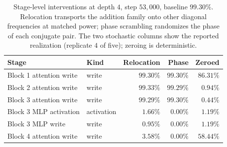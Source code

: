 \begin{table}[t]
\centering\small
\caption{Stage-level interventions at depth $4$, step $53{,}000$, baseline $99.30\%$.
Relocation transports the addition family onto other diagonal frequencies at matched power;
phase scrambling randomizes the phase of each conjugate pair. The two stochastic columns
show the reported realization (replicate $4$ of five); zeroing is deterministic.}
\label{tab:stagewise}
\begin{tabular}{llrrr}
\toprule
Stage & Kind & Relocation & Phase & Zeroed \\
\midrule
Block 1 attention write & write & $99.30\%$ & $99.30\%$ & $86.31\%$ \\
Block 2 attention write & write & $99.33\%$ & $99.29\%$ & $0.94\%$ \\
Block 3 attention write & write & $99.29\%$ & $99.30\%$ & $0.44\%$ \\
\midrule
Block 3 MLP activation & activation & $1.66\%$ & $0.00\%$ & $1.19\%$ \\
Block 3 MLP write & write & $0.95\%$ & $0.00\%$ & $1.19\%$ \\
Block 4 attention write & write & $3.58\%$ & $0.00\%$ & $58.44\%$ \\
\bottomrule
\end{tabular}
\end{table}
